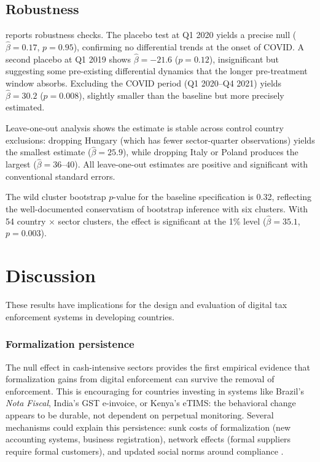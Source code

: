 \documentclass[12pt]{article}
\begin{document}


\subsection{Robustness}

 reports robustness checks. The placebo test at Q1 2020 yields a precise null ($\hat{\beta} = 0.17$, $p = 0.95$), confirming no differential trends at the onset of COVID. A second placebo at Q1 2019 shows $\hat{\beta} = -21.6$ ($p = 0.12$), insignificant but suggesting some pre-existing differential dynamics that the longer pre-treatment window absorbs. Excluding the COVID period (Q1 2020--Q4 2021) yields $\hat{\beta} = 30.2$ ($p = 0.008$), slightly smaller than the baseline but more precisely estimated.

Leave-one-out analysis shows the estimate is stable across control country exclusions: dropping Hungary (which has fewer sector-quarter observations) yields the smallest estimate ($\hat{\beta} = 25.9$), while dropping Italy or Poland produces the largest ($\hat{\beta} = 36$--$40$). All leave-one-out estimates are positive and significant with conventional standard errors.

The wild cluster bootstrap $p$-value for the baseline specification is 0.32, reflecting the well-documented conservatism of bootstrap inference with six clusters. With 54 country $\times$ sector clusters, the effect is significant at the 1\% level ($\hat{\beta} = 35.1$, $p = 0.003$).




\section{Discussion}

These results have implications for the design and evaluation of digital tax enforcement systems in developing countries.

\subsubsection*{Formalization persistence} The null effect in cash-intensive sectors provides the first empirical evidence that formalization gains from digital enforcement can survive the removal of enforcement. This is encouraging for countries investing in systems like Brazil's \textit{Nota Fiscal}, India's GST e-invoice, or Kenya's eTIMS: the behavioral change appears to be durable, not dependent on perpetual monitoring. Several mechanisms could explain this persistence: sunk costs of formalization (new accounting systems, business registration), network effects (formal suppliers require formal customers), and updated social norms around compliance \citep{luttmer2014tax}.
\end{document}
